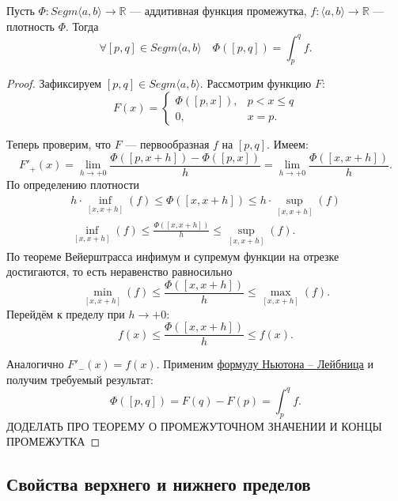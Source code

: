 \hypertarget{afp}{}
\begin{theorem}
	Пусть \(\Phi \colon Segm \langle a, b \rangle \to \mathbb{R}\) --- аддитивная функция промежутка, \(f \colon \langle a, b \rangle \to \mathbb{R}\) --- плотность \(\Phi\). Тогда \[
		\forall [p, q] \in Segm \langle a, b \rangle \quad \Phi([p, q]) = \int_p^q f.
	\]
\end{theorem}

\begin{proof}
	Зафиксируем \([p, q] \in Segm \langle a, b \rangle\). Рассмотрим функцию \(F\): \[
		F(x) =
		\begin{cases}
			\Phi([p, x]), & p < x \leqslant q \\
			0,			  & x = p.
		\end{cases}
	\]
	
	Теперь проверим, что \(F\) --- первообразная \(f\) на \([p, q]\). Имеем: \[
		F'_+(x) = \lim_{h \to +0} \frac{\Phi([p, x + h]) - \Phi([p, x])}{h} = \lim_{h \to +0} \frac{\Phi([x, x + h])}{h}.
	\]
	По определению плотности
	\begin{gather*}
		h \cdot \inf_{[x, x + h]}(f) \leqslant \Phi([x, x + h]) \leqslant h \cdot \sup_{[x, x + h]}(f) \\
		\inf_{[x, x + h]}(f) \leqslant \frac{\Phi([x, x + h])}{h} \leqslant \sup_{[x, x + h]}(f).
	\end{gather*}
	По теореме Вейерштрасса инфимум и супремум функции на отрезке достигаются, то есть неравенство равносильно \[
		\min_{[x, x + h]}(f) \leqslant \frac{\Phi([x, x + h])}{h} \leqslant \max_{[x, x + h]}(f).
	\]
	Перейдём к пределу при \(h \to +0\): \[
		f(x) \leqslant \frac{\Phi([x, x + h])}{h} \leqslant f(x).
	\]
	
	Аналогично \(F'_-(x) = f(x)\). Применим \hyperlink{t9}{формулу Ньютона -- Лейбница} и получим требуемый результат: \[
		\Phi([p, q]) = F(q) - F(p) = \int_p^q f.
	\]
	ДОДЕЛАТЬ ПРО ТЕОРЕМУ О ПРОМЕЖУТОЧНОМ ЗНАЧЕНИИ И КОНЦЫ ПРОМЕЖУТКА
\end{proof}

\subsection{Свойства верхнего и нижнего пределов}

